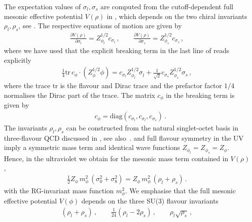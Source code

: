 \documentclass[aps,twocolumn,prd,superscriptaddress]{revtex4-2}
\begin{document}
The expectation values of $\sigma_l,\sigma_s$ are computed from the cutoff-dependent full mesonic effective potential $V(\rho)$ in , which depends on the two chiral invariants $\rho_l,\rho_s$, see . The respective equations of motion are given by 
%
\begin{align}
	\frac{\partial V(\rho)}{\partial \sigma_l} = Z_{\phi_l}^{1/2} c_{\sigma_l}\,,\qquad 	\frac{\partial V(\rho)}{\partial \sigma_s} = Z_{\phi_s}^{1/2} c_{\sigma_s}\,,
\end{align}
%
where we have used that the explicit breaking term in the last line of  reads explicitly 
%
\begin{align}
\frac14 \textrm{tr}\, c_\phi \cdot \left(Z_\phi^{1/2} \phi\right) = c^{\ }_{\sigma_l}  Z_{\phi^{\ }_l}^{1/2}\sigma^{\ }_l + \frac{1}{\sqrt{2}}  c^{\ }_{\sigma_s}Z^{1/2}_{\phi^{\ }_s}  \sigma^{\ }_s\,, 
\end{align}
%	
where the trace $\textrm{tr}$ is the flavour and Dirac trace and the prefactor factor $1/4$ normalises the Dirac part of the trace. The matrix $c_\phi$ in the breaking term is given by 
%
\begin{align}
	\quad c_\phi=\textrm{diag}(c_{\sigma_l},c_{\sigma_l},c_{\sigma_s})\,. 
\end{align}
%
The invariants $\rho_l, \rho_s$ can be constructed from the natural singlet-octet basis in three-flavour QCD discussed in , see also~\cite{Schaefer:2008hk, Mitter:2013fxa, Herbst:2013ufa, Rennecke:2016tkm, Wen:2018nkn, Fu:2018qsk, Fu:2019hdw}.  and full flavour symmetry in the UV imply a symmetric mass term and identical wave functions $Z_{\phi_l} =Z_{\phi_s}=Z_\phi$. Hence, in the ultraviolet we obtain for the mesonic mass term contained in $V(\rho)$, 
%
\begin{align}
\frac12 Z_\phi\, m_\phi^2\,  (\sigma_0^2 + \sigma_8^2) = Z_\phi\, m_\phi^2\, \left(\rho_l + \rho_s\right) \,. 
\label{eq:massphirhos}
\end{align}
%
with the RG-invariant mass function $m_\phi^2$. We emphasise that the full mesonic effective potential $V(\phi)$ depends on the three SU(3) flavour invariants 
%
\begin{align} 
\left( \rho_l + \rho_s\right)  \,,\qquad \frac{1}{24} \left( \rho_l - 2\rho_s \right)\,, \qquad  \rho_l \sqrt{\rho_s}  \,, 
\label{eq:ChiralINvariants}
\end{align}
%
\end{document}

